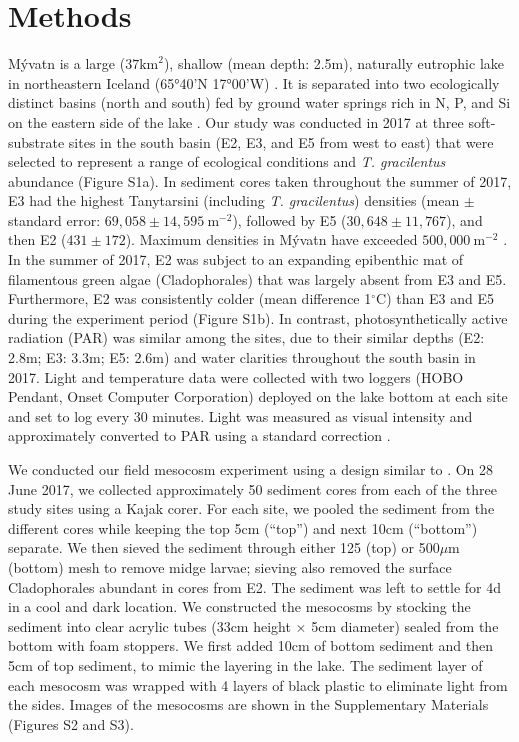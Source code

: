 \documentclass[12pt]{article}
\begin{document}
\section*{Methods}


M\'{y}vatn is a large ($37\text{km}^2$), shallow (mean depth: 2.5m), 
naturally eutrophic lake in northeastern Iceland (65°40’N 17°00’W) \citep{einarsson2004}.
It is separated into two ecologically distinct basins (north and south)
fed by ground water springs rich in N, P, and Si on the eastern side of the lake
\citep{einarsson2004}.
Our study was conducted in 2017 at three soft-substrate sites in the south basin  
(E2, E3, and E5 from west to east) 
that were selected to represent a range of ecological conditions 
and \textit{T. gracilentus} abundance (Figure S1a).
In sediment cores taken throughout the summer of 2017, E3 
had the highest Tanytarsini (including \textit{T. gracilentus}) densities 
(mean $\pm$ standard error: $69,058 \pm 14,595~\text{m}^{-2}$),
followed by E5 ($30,648 \pm 11,767$), and then E2 ($431 \pm 172$).
Maximum densities in M\'{y}vatn have exceeded $500,000~\text{m}^{-2}$ 
\citep{thorbergsdottir2004}.
In the summer of 2017, 
E2 was subject to an expanding epibenthic mat 
of filamentous green algae (Cladophorales) that was largely absent from E3 and E5.
Furthermore, E2 was consistently colder (mean difference 1$^{\circ}$C) 
than E3 and E5 during the experiment period (Figure S1b).
In contrast, photosynthetically active radiation (PAR) was similar among the sites,
due to their similar depths (E2: 2.8m; E3: 3.3m; E5: 2.6m)
and water clarities throughout the south basin in 2017.
Light and temperature data were collected with two loggers 
(HOBO Pendant, Onset Computer Corporation) deployed on the lake bottom at each site
and set to log every 30 minutes.
Light was measured as visual intensity
and approximately converted to PAR using a standard correction \citep{thimijan1983}.

We conducted our field mesocosm experiment using a design
similar to \cite{phillips2019}.
On 28 June 2017, we collected approximately 50 sediment cores from each 
of the three study sites using a Kajak corer. 
For each site, we pooled the sediment from the different cores while keeping the 
top 5cm (``top'') and next 10cm (``bottom'') separate.
We then sieved the sediment through either 125 (top) or 500$\mu \text{m}$ (bottom) mesh
to remove midge larvae; 
sieving also removed the surface Cladophorales abundant in cores from E2.
The sediment was left to settle for 4d in a cool and dark location.
We constructed the mesocosms by stocking the sediment into 
clear acrylic tubes (33cm height $\times$ 5cm diameter) 
sealed from the bottom with foam stoppers.
We first added 10cm of bottom sediment and then 5cm of top sediment, 
to mimic the layering in the lake.
The sediment layer of each mesocosm was wrapped with 4 layers of black plastic
to eliminate light from the sides.
Images of the mesocosms are shown in the Supplementary Materials (Figures S2 and S3).
\end{document}
